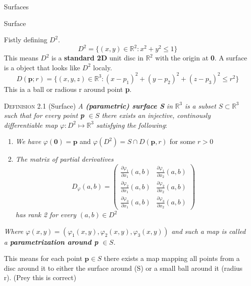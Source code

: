 \documentclass[12pt, letterpaper]{article}
\begin{document}
\begin{section}{Surfaces}

  \begin{subsection}{Surface}

    Fistly defining \(D^{2}\). \[D^{2} = \{ (x, y) \in \mathbb{R}^{2} : x^{2} + y^{2} \leq 1 \}\]
    This means \(D^{2}\) is a \textbf{standard 2D} unit disc in \(\mathbb{R}^{2}\)
    with the origin at \textbf{0}. A surface is a object that looks like \(D^{2}\)
    localy. \[D(\textbf{p}; r) = \{ (x, y, z) \in \mathbb{R}^{3} :
      (x - p_{1})^{2} + (y - p_{2})^{2} + (z - p_{3})^{2} \leq r^{2} \}\]
    This ia a ball or radious r around point \textbf{p}.

    \textsc{Definision 2.1} (Surface) \textit{A \textbf{(parametric) surface S}
      in \(\mathbb{R}^{3}\) is a subset \(S \subset \mathbb{R}^{3}\) such that for
      every point \textbf{p} \(\in S\) there exists an injective, continously
      differentiable map \(\varphi: D^{2} \mapsto \mathbb{R}^{3}\)
      satisfying the following}:
    \begin{enumerate}
      \item \textit{We have \(\varphi(\textbf{0}) = \textbf{p}\)} and
            \(\varphi(D^{2}) = S \cap D(\textbf{p}, r)\) for some \(r > 0\)
      \item \textit{The matrix of partial derivatives}
            \textit{\[ D_{\varphi}(a, b) =
            \begin{pmatrix}
              \frac{\partial \varphi_{1}}{\partial x_{1}}(a, b) & \frac{\partial \varphi_{1}}{\partial x_{2}}(a, b) \\
              \frac{\partial \varphi_{2}}{\partial x_{1}}(a, b) & \frac{\partial \varphi_{2}}{\partial x_{2}}(a, b) \\
              \frac{\partial \varphi_{3}}{\partial x_{1}}(a, b) & \frac{\partial \varphi_{3}}{\partial x_{2}}(a, b)
            \end{pmatrix}\]}
            \textit{has rank 2 for every \((a, b) \in D^{2}\)}
    \end{enumerate}
    \textit{Where
      \(\varphi(x, y) = (\varphi_{1}(x, y), \varphi_{2}(x, y), \varphi_{3}(x, y))\)
      and such a map is called a \textbf{parametrization around p} \(\in S\).}

    This means for each point \(\textbf{p} \in S\) there exists a map mapping
    all points from a disc around it to either the surface around (S) or a
    small ball around it (radius r). (Prey this is correct)


\end{subsection}
\end{section}
\end{document}
